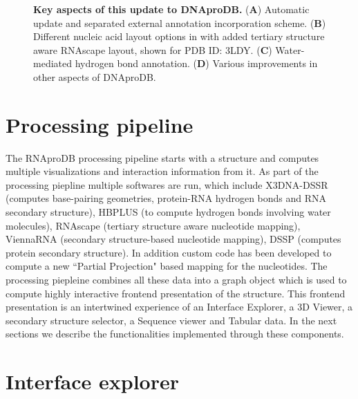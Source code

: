\begin{center}
    \begin{figure}
        \caption[Key aspects of this update to DNAproDB.]{\textbf{Key aspects of this update to DNAproDB.} ({\bf A}) Automatic update and separated external annotation incorporation scheme.  ({\bf B})  Different nucleic acid layout options in with added tertiary structure aware RNAscape layout, shown for PDB ID: 3LDY. ({\bf C}) Water-mediated hydrogen bond annotation. ({\bf D}) Various improvements in other aspects of DNAproDB. }
  \label{fig:rnaprodb1}
\end{figure}
\end{center}

\section{Processing pipeline}
The RNAproDB processing pipeline starts with a structure and computes multiple visualizations and interaction information from it. As part of the processing piepline multiple softwares are run, which include X3DNA-DSSR (computes base-pairing geometries, protein-RNA hydrogen bonds and RNA secondary structure), HBPLUS (to compute hydrogen bonds involving water molecules), RNAscape (tertiary structure aware nucleotide mapping), ViennaRNA (secondary structure-based nucleotide mapping), DSSP (computes protein secondary structure). In addition custom code has been developed to compute a new ``Partial Projection" based mapping for the nucleotides. The processing piepleine combines all these data into a graph object which is used to compute highly interactive frontend presentation of the structure. This frontend presentation is an intertwined experience of an Interface Explorer, a 3D Viewer, a secondary structure selector, a Sequence viewer and Tabular data. In the next sections we describe the functionalities implemented through these components.

\section{Interface explorer}

